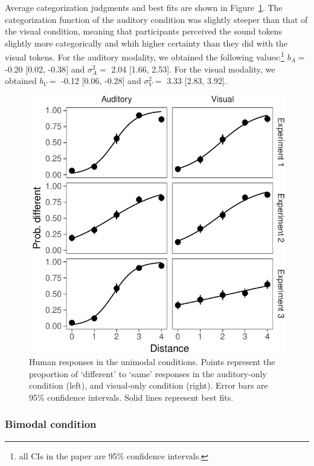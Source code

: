 \documentclass[english,floatsintext,man]{apa6}
\theoremstyle{definition}
\theoremstyle{definition}
\theoremstyle{definition}
\theoremstyle{remark}
\begin{document}
Average categorization judgments and best fits are shown in
Figure~\ref{fig:unimodal}. The categorization function of the auditory
condition was slightly steeper than that of the visual condition,
meaning that participants perceived the sound tokens slightly more
categorically and whih higher certainty than they did with the visual
tokens. For the auditory modality, we obtained the following
values:\footnote{all CIs in the paper are 95\% confidence intervals.}
\(b_A=\) -0.20 {[}0.02, -0.38{]} and \(\sigma^2_A=\) 2.04 {[}1.66,
2.53{]}. For the visual modality, we obtained \(b_V=\) -0.12 {[}0.06,
-0.28{]} and \(\sigma^2_V=\) 3.33 {[}2.83, 3.92{]}.

\begin{figure}[!h]
\includegraphics[width=\textwidth]{ms_files/figure-latex/unimodal-1} \caption{Human responses in the unimodal conditions. Points represent the proportion of `different' to `same' responses in the auditory-only condition (left), and visual-only condition (right). Error bars are 95\% confidence intervals. Solid lines represent best fits.}\label{fig:unimodal}
\end{figure}

\subsubsection{Bimodal condition}\label{bimodal-condition-1}
\end{document}
